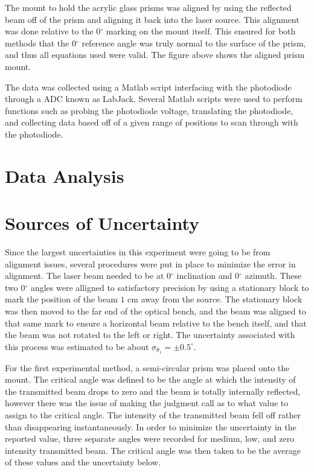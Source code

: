 \documentclass[colorlinks=true,pdfstartview=FitV,linkcolor=blue,
            citecolor=red,urlcolor=magenta]{basedoc}
\begin{document}
  The mount to hold the acrylic glass prisms was aligned by using the reflected beam off of the prism and aligning it back into the laser source. This alignment was done relative to the 0$^{\circ}$ marking on the mount itself. This ensured for both methods that the 0$^{\circ}$ reference angle was truly normal to the surface of the prism, and thus all equations used were valid. The figure above shows the aligned prism mount.

  The data was collected using a Matlab script interfacing with the photodiode through a ADC known as LabJack. Several Matlab scripts were used to perform functions such as probing the photodiode voltage, translating the photodiode, and collecting data based off of a given range of positions to scan through with the photodiode.


\section{Data Analysis}



\section{Sources of Uncertainty}

  Since the largest uncertainties in this experiment were going to be from alignment issues, several procedures were put in place to minimize the error in alignment. The laser beam needed to be at 0$^{\circ}$ inclination and 0$^{\circ}$ azimuth. These two 0$^{\circ}$ angles were alligned to satisfactory precision by using a stationary block to mark the position of the beam $1$ cm away from the source. The stationary block was then moved to the far end of the optical bench, and the beam was aligned to that same mark to ensure a horizontal beam relative to the bench itself, and that the beam was not rotated to the left or right. The uncertainty associated with this process was estimated to be about $\sigma_{\theta_1} = \pm 0.5^{\circ}$.

  For the first experimental method, a semi-circular prism was placed onto the mount. The critical angle was defined to be the angle at which the intensity of the transmitted beam drops to zero and the beam is totally internally reflected, however there was the issue of making the judgment call as to what value to assign to the critical angle. The intensity of the transmitted beam fell off rather than disappearing instantaneously. In order to minimize the uncertainty in the reported value, three separate angles were recorded for medium, low, and zero intensity transmitted beam. The critical angle was then taken to be the average of these values and the uncertainty below.
\end{document}
